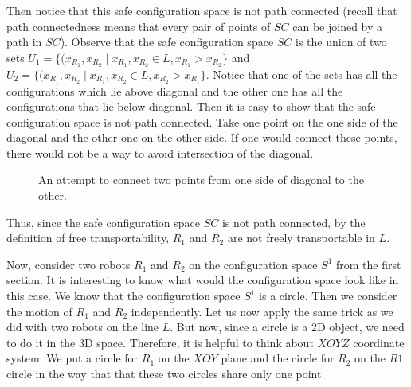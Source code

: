 \documentclass[12pt]{article}
\theoremstyle{definition}
\begin{document}
Then notice that this safe configuration space is not path connected (recall that path connectedness
means that every pair of points of $SC$ can be joined by a path in $SC$). Observe that the safe configuration
space $SC$ is the union of two sets $U_1 = \{(x_{R_1}, x_{R_2} \mid x_{R_1}, x_{R_2} \in L, x_{R_1} > x_{R_2}\}$
and $U_2 = \{(x_{R_1}, x_{R_2} \mid x_{R_1}, x_{R_2} \in L, x_{R_2} > x_{R_1}\}$. Notice that one of the sets
has all the configurations which lie above diagonal and the other one has all the configurations that lie below
diagonal. Then it is easy to show that the safe configuration space is not path connected. Take one point on the
one side of the diagonal and the other one on the other side. If one would connect these points, there would not be a
way to avoid intersection of the diagonal.

\begin{figure}[H]
    \centering
    \caption*{An attempt to connect two points from one side of diagonal to the other.}
\end{figure}

Thus, since the safe configuration space $SC$ is not path connected, by the definition of free transportability,
$R_1$ and $R_2$ are not freely transportable in $L$.

\bigskip

Now, consider two robots $R_1$ and $R_2$ on the configuration space $S^1$ from the first section.
It is interesting to know what would the configuration space look like in this case.
We know that the configuration space $S^1$ is a circle. Then we consider the motion of $R_1$ and $R_2$ independently.
Let us now apply the same trick as we did with two robots on the line $L$. But now, since a circle is a 2D object,
we need to do it in the 3D space. Therefore, it is helpful to think about $XOYZ$ coordinate system.
We put a circle for $R_1$ on the $XOY$ plane and the circle for $R_2$ on the $R1$ circle in the way that
that these two circles share only one point.
\end{document}

